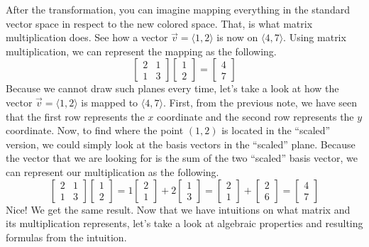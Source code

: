 \documentclass[../main.tex]{subfiles}
\begin{document}
After the transformation, you can imagine mapping everything
in the standard vector space in respect to the new colored
space. That, is what matrix multiplication does. See how
a vector $\vec{v} = \langle 1, 2 \rangle$ is now on
$\langle 4, 7 \rangle$. Using matrix multiplication, we can
represent the mapping as the following.
\[
\begin{bmatrix}
    2 & 1 \\
    1 & 3
\end{bmatrix}
\begin{bmatrix}
    1 \\
    2
\end{bmatrix}
=
\begin{bmatrix}
    4 \\
    7
\end{bmatrix}
\]
Because we cannot draw such planes every time, let's take a look
at how the vector $\vec{v} = \langle 1, 2 \rangle$ is mapped to
$\langle 4, 7 \rangle$. First, from the previous note, we have seen
that the first row represents the $x$ coordinate and the second
row represents the $y$ coordinate. Now, to find where the point
$(1, 2)$ is located in the ``scaled'' version, we could simply look
at the basis vectors in the ``scaled'' plane. Because the vector
that we are looking for is the sum of the two ``scaled'' basis
vector, we can represent our multiplication as the following.
\[
\begin{bmatrix}
    2 & 1 \\
    1 & 3
\end{bmatrix}
\begin{bmatrix}
    1 \\
    2
\end{bmatrix}
=
1
\begin{bmatrix}
    2 \\
    1
\end{bmatrix}
+
2
\begin{bmatrix}
    1 \\
    3
\end{bmatrix}
=
\begin{bmatrix}
    2 \\
    1
\end{bmatrix}
+
\begin{bmatrix}
    2 \\
    6
\end{bmatrix}
=
\begin{bmatrix}
    4 \\
    7
\end{bmatrix}
\]
Nice! We get the same result. Now that we have intuitions on what
matrix and its multiplication represents, let's take a look at
algebraic properties and resulting formulas from the intuition.
\end{document}
